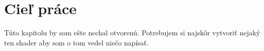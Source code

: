 \chapter{Cieľ práce}\label{chap:ciel}

Túto kapitolu by som ešte nechal otvorenú. Potrebujem si najskôr vytvoriť nejaký ten shader aby som o tom vedel niečo napísať.